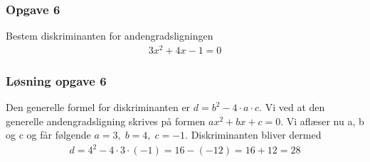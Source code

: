 \subsubsection{Opgave 6}

Bestem diskriminanten for andengradsligningen
\begin{align*}
    3x^2 + 4x -1 = 0
\end{align*}

\subsubsection*{Løsning opgave 6}

Den generelle formel for diskriminanten er $d = b^2 - 4\cdot a\cdot c$. Vi ved at den generelle andengradsligning skrives på formen $ax^2 + bx + c = 0$. Vi aflæser nu a, b og c og får følgende $a = 3,\; b = 4,\; c = -1$. Diskriminanten bliver dermed
\begin{align*}
    d = 4^2 -4\cdot 3\cdot (-1) = 16 - (-12) = 16 + 12 = 28
\end{align*}
